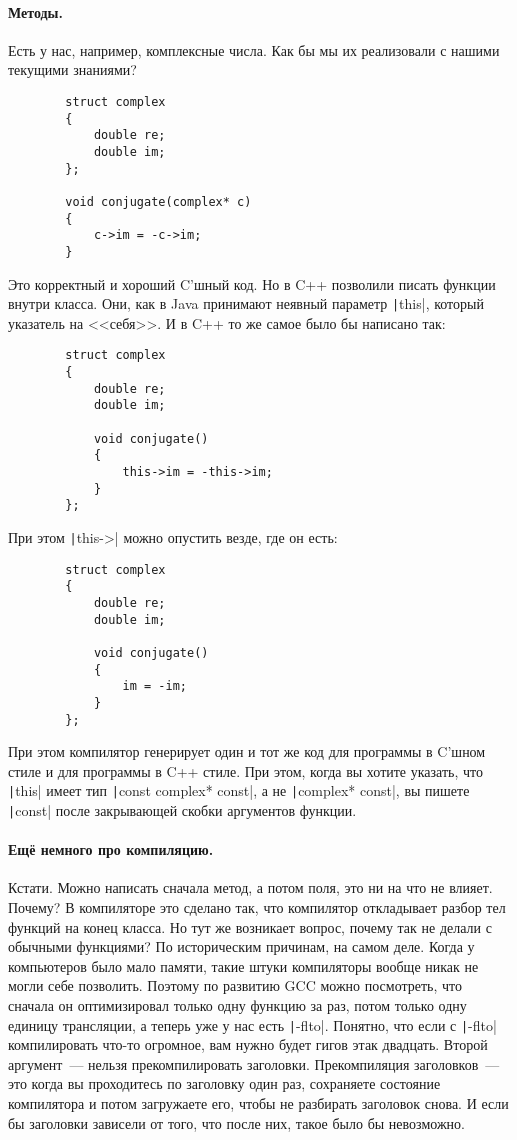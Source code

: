 \documentclass{article}
\begin{document}
    \paragraph{Методы.}
    Есть у нас, например, комплексные числа. Как бы мы их реализовали с нашими текущими знаниями?
    \begin{verbatim}
        struct complex
        {
            double re;
            double im;
        };

        void conjugate(complex* c)
        {
            c->im = -c->im;
        }
    \end{verbatim}
    Это корректный и хороший C'шный код. Но в C++ позволили писать функции внутри класса. Они, как в Java принимают неявный параметр \texttt|this|, который указатель на <<себя>>. И в C++ то же самое было бы написано так:
    \begin{verbatim}
        struct complex
        {
            double re;
            double im;

            void conjugate()
            {
                this->im = -this->im;
            }
        };
    \end{verbatim}
    При этом \texttt|this->| можно опустить везде, где он есть:
    \begin{verbatim}
        struct complex
        {
            double re;
            double im;
            
            void conjugate()
            {
                im = -im;
            }
        };
    \end{verbatim}
    При этом компилятор генерирует один и тот же код для программы в C'шном стиле и для программы в C++ стиле. При этом, когда вы хотите указать, что \texttt|this| имеет тип \texttt|const complex* const|, а не \texttt|complex* const|, вы пишете \texttt|const| после закрывающей скобки аргументов функции.
    \paragraph{Ещё немного про компиляцию.}
    Кстати. Можно написать сначала метод, а потом поля, это ни на что не влияет. Почему? В компиляторе это сделано так, что компилятор откладывает разбор тел функций на конец класса. Но тут же возникает вопрос, почему так не делали с обычными функциями? По историческим причинам, на самом деле. Когда у компьютеров было мало памяти, такие штуки компиляторы вообще никак не могли себе позволить. Поэтому по развитию GCC можно посмотреть, что сначала он оптимизировал только одну функцию за раз, потом только одну единицу трансляции, а теперь уже у нас есть \texttt|-flto|. Понятно, что если с \texttt|-flto| компилировать что-то огромное, вам нужно будет гигов этак двадцать. Второй аргумент~--- нельзя прекомпилировать заголовки. Прекомпиляция заголовков~--- это когда вы проходитесь по заголовку один раз, сохраняете состояние компилятора и потом загружаете его, чтобы не разбирать заголовок снова. И если бы заголовки зависели от того, что после них, такое было бы невозможно.
\end{document}
